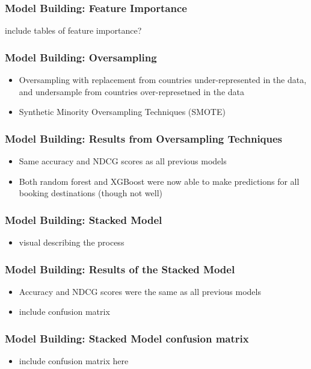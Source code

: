 \documentclass{beamer}
\begin{document}
\begin{frame}
\frametitle{Model Building: Feature Importance}
include tables of feature importance? 
\end{frame}

\begin{frame}
\frametitle{Model Building: Oversampling}
\begin{itemize}
  \item Oversampling with replacement from countries under-represented in the data, and undersample from countries over-represetned in the data
  \item Synthetic Minority Oversampling Techniques (SMOTE)
\end{itemize}
\end{frame}

\begin{frame}
\frametitle{Model Building: Results from Oversampling Techniques}
\begin{itemize}
  \item Same accuracy and NDCG scores as all previous models
  \item Both random forest and XGBoost were now able to make predictions for all booking destinations (though not well) 
\end{itemize}
\end{frame}

\begin{frame}
\frametitle{Model Building: Stacked Model}
\begin{itemize}
  \item visual describing the process
\end{itemize}
\end{frame}

\begin{frame}
\frametitle{Model Building: Results of the Stacked Model}
\begin{itemize}
  \item Accuracy and NDCG scores were the same as all previous models 
  \item include confusion matrix 
\end{itemize}
\end{frame}

\begin{frame}
\frametitle{Model Building: Stacked Model confusion matrix}
\begin{itemize}
  \item include confusion matrix here 
\end{itemize}
\end{frame}
\end{document}
